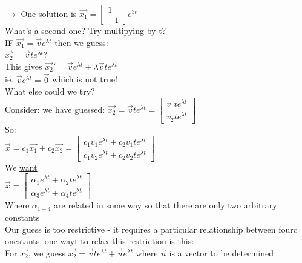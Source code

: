 \documentclass[12pt]{article}
\begin{document}
	$\rightarrow$ One solution is $\overrightarrow{x_1} = \begin{bmatrix} 1 \\ -1\end{bmatrix} e^{3t}$\\
	
	What's a second one? Try multipying by t?\\
	
	IF $\overrightarrow{x_1} = \overrightarrow{v}e^{\lambda t}$ then we guess:\\
	$\overrightarrow{x_2} = \overrightarrow{v}te^{\lambda t}$?\\
	This gives $\overrightarrow{x_2}' = \overrightarrow{v}e^{\lambda t} + \lambda \overrightarrow{v}te^{\lambda t}$\\
	ie. $\overrightarrow{v}e^{\lambda t} = \overrightarrow{0}$ which is not true!\\
	
	What else could we try?\\
	
	Consider: we have guessed: $\overrightarrow{x_2} = \overrightarrow{v}te^{\lambda t} = \begin{bmatrix}
	v_1te^{\lambda t} \\ v_2te^{\lambda t}
	\end{bmatrix}$\\
	So:\\
	$\overrightarrow{x} = c_1\overrightarrow{x_1} + c_2\overrightarrow{x_2} = \begin{bmatrix}
	c_1v_1e^{\lambda t} + c_2v_1te^{\lambda t} \\ c_1v_2e^{\lambda t} + c_2v_2te^{\lambda t}
	\end{bmatrix}$\\
	
	We \underline{want}\\
	$\overrightarrow{x} = \begin{bmatrix}
	\alpha_1 e^{\lambda t} + \alpha_2te^{\lambda t} \\
	\alpha_3 e^{\lambda t} + \alpha_4 te^{\lambda t}
	\end{bmatrix}$\\
	Where $\alpha_{1-4}$ are related in some way so that there are only two arbitrary constants\\
	
	Our guess is too restrictive - it requires a particular relationship between fourc oncstants, one wayt to relax this restriction is this:\\
	For $\overrightarrow{x_2}$, we guess $\overrightarrow{x_2} = \overrightarrow{v}te^{\lambda t} + \overrightarrow{u}e^{\lambda t}$ where $\overrightarrow{u}$ is a vector to be determined\\
	
\end{document}

